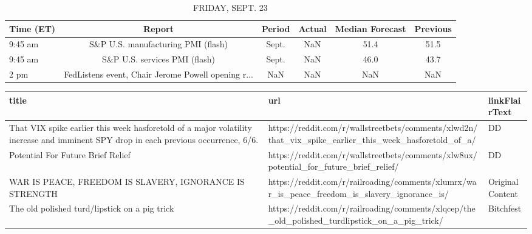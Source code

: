 \documentclass{book}
\begin{document}
  
  \begin{table}[htbp]%
  \caption{FRIDAY, SEPT. 23}%
  \centering%
  \begin{adjustbox}{width=1\textwidth}%
  \begin{tabular}{lccccc}
  \toprule
  Time (ET) &                                             Report & Period & Actual & Median Forecast & Previous \\
  \midrule
    9:45 am &                 S\&P U.S. manufacturing PMI (flash) &  Sept. &    NaN &            51.4 &     51.5 \\
    9:45 am &                      S\&P U.S. services PMI (flash) &  Sept. &    NaN &            46.0 &     43.7 \\
       2 pm & FedListens event, Chair Jerome Powell opening r... &    NaN &    NaN &             NaN &      NaN \\
  \bottomrule
  \end{tabular}
  \end{adjustbox}%
  \end{table}
  
  
  
  \begin{table}[htbp]%
  \centering%
  \begin{adjustbox}{width=1\textwidth}%
  \begin{tabular}{lll}
  \toprule
                                                                                                                                title &                                                                                                    url &    linkFlairText \\
  \midrule
  That VIX spike earlier this week hasforetold of a major volatility increase and imminent SPY drop in each previous occurrence, 6/6. & https://reddit.com/r/wallstreetbets/comments/xlwd2n/that\_vix\_spike\_earlier\_this\_week\_hasforetold\_of\_a/ &               DD \\
                                                                                                    Potential For Future Brief Relief &                 https://reddit.com/r/wallstreetbets/comments/xlw8ux/potential\_for\_future\_brief\_relief/ &               DD \\
                                                                              WAR IS PEACE, FREEDOM IS SLAVERY, IGNORANCE IS STRENGTH &         https://reddit.com/r/railroading/comments/xlumrx/war\_is\_peace\_freedom\_is\_slavery\_ignorance\_is/ & Original Content \\
                                                                                   The old polished turd/lipstick on a pig trick &         https://reddit.com/r/railroading/comments/xlqcep/the\_old\_polished\_turdlipstick\_on\_a\_pig\_trick/ &        Bitchfest \\
  \bottomrule
  \end{tabular}
  \end{adjustbox}%
  \end{table}
  
\end{document}

